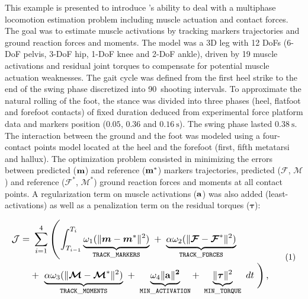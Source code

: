 This example is presented to introduce \bioptim's ability to deal with a multiphase locomotion estimation problem including muscle actuation and contact forces.
The goal was to estimate muscle activations by tracking markers trajectories and ground reaction forces and moments. 
The model was a 3D leg with 12 DoFs (6-DoF pelvis, 3-DoF hip, 1-DoF knee and 2-DoF ankle), driven by 19 muscle activations and residual joint torques to compensate for potential muscle actuation weaknesses. 
The gait cycle was defined from the first heel strike to the end of the swing phase discretized into 90~shooting intervals. 
To approximate the natural rolling of the foot, the stance was divided into three phases (heel, flatfoot and forefoot contacts) of fixed duration deduced from experimental force platform data and markers position ($0.05$, $0.36$ and $\SI{0.16}{\second}$).
The swing phase lasted $\SI{0.38}{\second}$. 
The interaction between the ground and the foot was modeled using a four-contact points model located at the heel and the forefoot (first, fifth metatarsi and hallux).
The optimization problem consisted in minimizing the errors between predicted ($\bf{m}$) and reference ($\bf{m}^*$) markers trajectories, predicted ($\bm{\mathcal{F}}$, $\bm{\mathcal{M}}$) and reference ($\bm{\mathcal{F}^*}$, $\bm{\mathcal{M}}^*$) ground reaction forces and moments at all contact points.
A regularization term on muscle activations ($\bf{a}$) was also added (least-activations) as well as a penalization term on the residual torques ($\boldsymbol{\tau}$):

\[ 
\resizebox{0.9\columnwidth}{!}{$ 
\begin{aligned}
\mathcal{J} = &~\sum_{i=1}^4\left(\int_{T_{i-1}}^{T_i}\underbrace{\omega_1(\|\bm{m} - \bm{m}^*\|^{2})}_{\mathtt{TRACK\_MARKERS}}~ 
+ ~ \underbrace{\alpha\omega_2(\|\bm{\mathcal{F}} - \bm{\mathcal{F}}^*\|^{2})}_{\mathtt{TRACK\_FORCES}}\right.\\
&+ ~ \underbrace{\alpha\omega_3(\|\bm{\mathcal{M}} - \bm{\mathcal{M}}^*\|^{2})}_{\mathtt{TRACK\_MOMENTS}}~
+ ~ \underbrace{\omega_4\|\bf{a}\|^2}_{\mathtt{MIN\_ACTIVATION}}
+ ~ \underbrace{\|\boldsymbol{\tau}\|^2}_{\mathtt{MIN\_TORQUE}}~dt\left.\vphantom{\int_{T_{i-1}}^{T_i}}\right), 
\end{aligned}  
$}  
\addtag  
\label{eq:ocp_walk}  
\]

